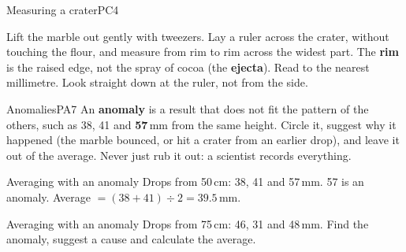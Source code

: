 
\begin{technique}{Measuring a crater}{PC4}
\begin{minipage}[c]{0.6\linewidth}
Lift the marble out gently with tweezers. Lay a ruler across the crater, without touching the flour, and measure from rim to rim across the widest part. The \textbf{rim} is the raised edge, not the spray of cocoa (the \textbf{ejecta}). Read to the nearest millimetre. Look straight down at the ruler, not from the side.
\end{minipage}\hfill
\begin{minipage}[c]{0.36\linewidth}\centering
{}
\end{minipage}
\end{technique}

\begin{technique}{Anomalies}{PA7}
An \textbf{anomaly} is a result that does not fit the pattern of the others, such as 38, 41 and \textbf{57}\,mm from the same height. Circle it, suggest why it happened (the marble bounced, or hit a crater from an earlier drop), and leave it out of the average. Never just rub it out: a scientist records everything.
\end{technique}

\begin{workedex}{Averaging with an anomaly}
Drops from 50\,cm: 38, 41 and 57\,mm. 57 is an anomaly. \quad Average $= (38 + 41) \div 2 = 39.5$\,mm.
\end{workedex}

\begin{wedo}{Averaging with an anomaly}
Drops from 75\,cm: 46, 31 and 48\,mm. Find the anomaly, suggest a cause and calculate the average.
\workbox{3cm}
\end{wedo}

